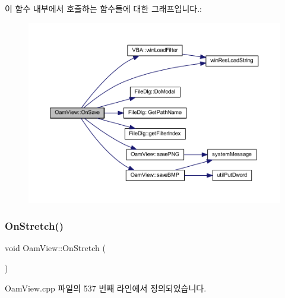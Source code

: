 이 함수 내부에서 호출하는 함수들에 대한 그래프입니다.\+:
\nopagebreak
\begin{figure}[H]
\begin{center}
\leavevmode
\includegraphics[width=350pt]{class_oam_view_adb535d2f90a5c8edce8cb900e64a5854_cgraph}
\end{center}
\end{figure}
\mbox{\label{class_oam_view_a60c3ddf70e740451daa8bb8a76661667}} 
\subsubsection{\texorpdfstring{On\+Stretch()}{OnStretch()}}
{\footnotesize\ttfamily void Oam\+View\+::\+On\+Stretch (\begin{DoxyParamCaption}{ }\end{DoxyParamCaption})\hspace{0.3cm}{\ttfamily [protected]}}



Oam\+View.\+cpp 파일의 537 번째 라인에서 정의되었습니다.


